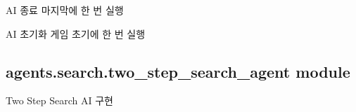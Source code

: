 \documentclass[letterpaper,10pt,english]{sphinxmanual}
\begin{document}
\begin{fulllineitems}
\begin{fulllineitems}
\end{fulllineitems}


\begin{fulllineitems}
\label{\detokenize{agents.search:agents.search.one_step_search_agent.OneStepSearchAgent.close}}
AI 종료
마지막에 한 번 실행

\end{fulllineitems}


\begin{fulllineitems}
\label{\detokenize{agents.search:agents.search.one_step_search_agent.OneStepSearchAgent.reset}}
AI 초기화
게임 초기에 한 번 실행

\end{fulllineitems}


\end{fulllineitems}



\subsection{agents.search.two\_step\_search\_agent module}
\label{\detokenize{agents.search:module-agents.search.two_step_search_agent}}\label{\detokenize{agents.search:agents-search-two-step-search-agent-module}}
Two Step Search AI 구현
\end{document}
